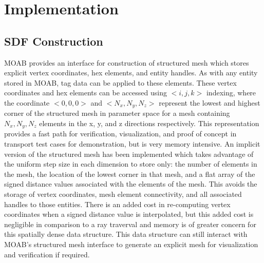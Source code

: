 \section{Implementation}

\subsection{SDF Construction}

MOAB provides an interface for construction of structured mesh which stores
explicit vertex coordinates, hex elements, and entity handles. As with any
entity stored in MOAB, tag data can be applied to these elements. These vertex
coordinates and hex elements can be accessed using $<i,j,k>$ indexing, where the
coordinate $<0,0,0>$ and  $<N_{x}, N_{y}, N_{z}>$ represent the lowest and
highest corner of the structured mesh in
parameter space for a mesh containing $N_{x},N_{y},N_{z}$ elements in the x, y,
and z directions respectively. This representation provides
a fast path for verification, visualization, and proof of concept in transport
test cases for demonstration, but is very memory intensive. An implicit version
of the structured mesh has been implemented which takes advantage of the uniform
step size in each dimension to store only: the number of elements in the mesh,
the location of the lowest corner in that mesh, and a flat array of the signed
distance values associated with the elements of the mesh.
This avoids the storage of vertex coordinates, mesh element connectivity, and
all associated handles to those entities. There is an added cost in re-computing
vertex coordinates when a signed distance value is interpolated, but this added
cost is negligible in comparison to a ray traverval and memory is of greater
concern for this spatially dense data structure. This data structure can still
interact with MOAB's structured mesh interface to generate an explicit mesh for
visualization and verification if required.



